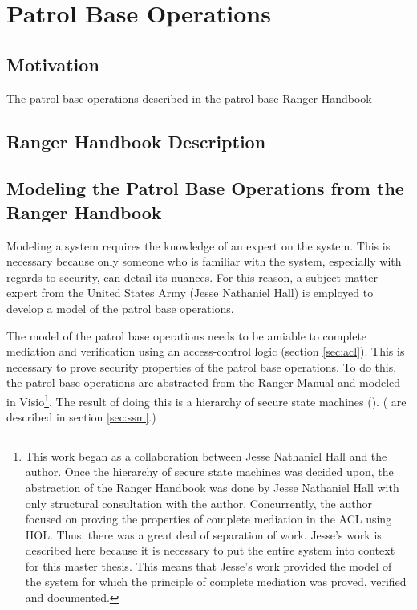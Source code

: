 \documentclass[../../main/main.tex]{subfiles}
\begin{document}
\chapter{Patrol Base Operations}
\section{Motivation}
The patrol base operations described in the patrol base Ranger Handbook

\section{Ranger Handbook Description}

\section{Modeling the Patrol Base Operations from the Ranger Handbook}\label{sec:modelingpb}
\glsresetall[\acronymtype]

Modeling a system requires the knowledge of an expert on the system.  This is necessary because only someone who is familiar with the system, especially with regards to security, can detail its nuances.  For this reason, a subject matter expert from the United States Army (Jesse Nathaniel Hall) is employed to develop a model of the patrol base operations. 

The model of the patrol base operations needs to be amiable to complete mediation and verification using an access-control logic (section \ref{sec:acl}).  This is necessary to prove security properties of the patrol base operations.  To do this, the patrol base operations are abstracted from the Ranger Manual and modeled in Visio\footnote{This work began as a collaboration between Jesse Nathaniel Hall and the author.  Once the hierarchy of secure state machines was decided upon, the abstraction of the Ranger Handbook was done by Jesse Nathaniel Hall with only structural consultation with the author.  Concurrently, the author focused on proving the properties of complete mediation in the ACL using HOL.  Thus, there was a great deal of separation of work.  Jesse's work is described here because it is necessary to put the entire system into context for this master thesis.  This means that Jesse's work provided the model of the system for which the principle of complete mediation was proved, verified and documented.}.  The result of doing this is a hierarchy of secure state machines (). ( are described in section \ref{sec:ssm}.)  
\end{document}
